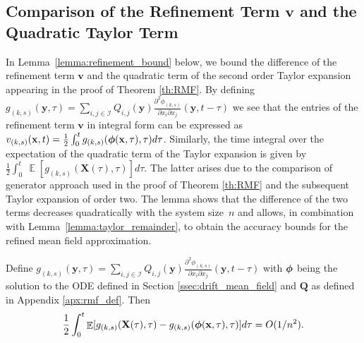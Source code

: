 \documentclass[acmsmall]{acmart}
\newcommand\bx{\mathbf{x}}
\newcommand\bX{\mathbf{X}}
\newcommand\by{\mathbf{y}}
\newcommand\bv{\mathbf{v}}
\newcommand\bphi{\text{\boldmath$\phi$}}
\newcommand\bQ{\mathbf{Q}}
\newcommand\calI{\mathcal{I}}
\DeclareMathOperator{\E}{\mathbb{E}} %
\begin{document}

\subsection{Comparison of the Refinement Term $\bv$ and the Quadratic Taylor Term}

In Lemma~\ref{lemma:refinement_bound} below, we bound the difference of the refinement term $\bv$ and the quadratic term of the second order Taylor expansion appearing in the proof of Theorem \ref{th:RMF}. By defining $g_{(k,s)}(\by, \tau) = \sum_{i,j \in \calI} Q_{i,j}(\by) \frac{\partial^2 \phi_{(k,s)}}{\partial x_{i} \partial x_{j}} (\by, t-\tau)$ we see that the entries of the refinement term $\bv$ in integral form can be expressed as $v_{(k,s)}(\bx, t) = \frac{1}{2}\int_0^t g_{(k,s)}(\bphi(\bx, \tau), \tau) d\tau$. Similarly, the time integral over the expectation of the quadratic term of the Taylor expansion is given by $\frac{1}{2}\int_0^t\!\! \ \E [ g_{(k,s)}(\bX(\tau),\tau)]d\tau$. The latter arises due to the comparison of generator approach used in the proof of Theorem \ref{th:RMF} and the subsequent Taylor expansion of order two. The lemma shows that the difference of the two terms decreases quadratically with the system size~$n$ and allows, in combination with Lemma~\ref{lemma:taylor_remainder}, to obtain the accuracy bounds for the refined mean field approximation.


\begin{lemma}
\label{lemma:refinement_bound}

Define $g_{(k,s)}(\by, \tau) = \sum_{i,j \in \calI} Q_{i,j}(\by) \frac{\partial^2 \phi_{(k,s)}}{\partial x_{i} \partial x_{j}} (\by, t-\tau)$ with $\bphi$ being the solution to the ODE defined in Section \ref{ssec:drift_mean_field} and $\bQ$ as defined in Appendix \ref{apx:rmf_def}. Then
  \begin{align*}
   \frac{1}{2}\int_0^t \E [ g_{(k,s)}(\bX(\tau),\tau) - g_{(k,s)}(\bphi(\bx, \tau),\tau)]d\tau = O(1/n^2). 
  \end{align*}
\end{lemma}
\end{document}
